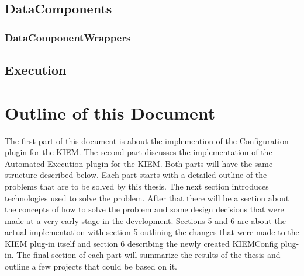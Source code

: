\subsection{DataComponents}
\label{section:IntroDataComponent}

\subsubsection{DataComponentWrappers}
\label{section:IntroDataComponentWrapper}

\subsection{Execution}
\label{section:IntroExecution}



\section{Outline of this Document}
\label{sec:intro/Outline}
The first part of this document is about the implemention of the Configuration plugin for the \ac{KIEM}.
The second part discusses the implementation of the Automated Execution plugin for the \ac{KIEM}. Both
parts will have the same structure described below.
Each part starts with a detailed outline of the problems that are to be solved by this thesis.
The next section introduces technologies used to solve the problem.
After that there will be a section about the concepts of how to solve the problem and some
design decisions that were made at a very early stage in the development.
Sections 5 and 6 are about the actual implementation with section 5 outlining the changes
that were made to the \ac{KIEM} plug-in itself and section 6 describing the newly created
\ac{KIEMConfig} plug-in.
The final section of each part will summarize the results of the thesis and outline
a few projects that could be based on it.








